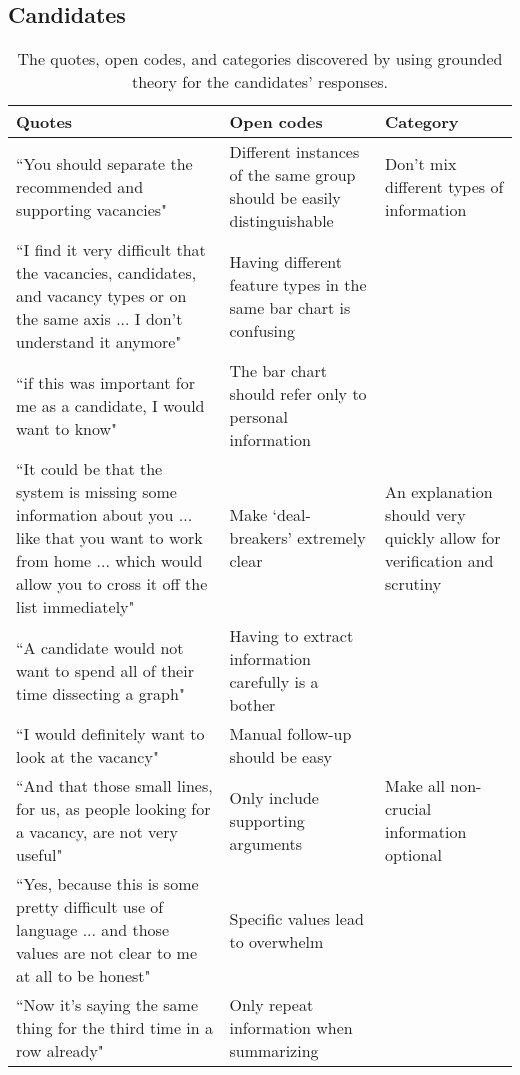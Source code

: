 \subsection{Candidates}
\begin{table*}[]
\captionsetup{width=1.5\textwidth}
\caption{The quotes, open codes, and categories discovered by using grounded theory for the candidates' responses.}
\footnotesize
\begin{adjustwidth}{-2.5in}{-2.5in}
\centering
\begin{tabularx}{1.5\textwidth}{@{}X>{\raggedright\arraybackslash}p{6.5cm}>{\raggedright\arraybackslash}p{3.5cm}@{}}
\toprule
\textbf{Quotes} &
  \textbf{Open codes} &
  \textbf{Category} \\ \midrule
``You should separate the recommended and supporting vacancies" &
  Different instances of the same group should be easily distinguishable &
  Don't mix different types of information \\ \cmidrule(r){1-1}
``I find it very difficult that the vacancies, candidates, and vacancy types or on the same axis ... I don't understand it anymore" &
  Having different feature types in the same bar chart is confusing &
   \\ \cmidrule(r){1-1}
``if this was important for me as a candidate, I would want to know" &
  The bar chart should refer only to personal information &
   \\ \midrule
``It could be that the system is missing some information about you ... like that you want to work from home ... which would allow you to cross it off the list immediately" &
  Make `deal-breakers' extremely clear &
  An explanation should very quickly allow for verification and scrutiny \\ \cmidrule(r){1-1}
``A candidate would not want to spend all of their time dissecting a graph" &
  Having to extract information carefully is a bother &
   \\ \cmidrule(r){1-1}
``I would definitely want to look at the vacancy" &
  Manual follow-up should be easy &
   \\ \midrule
``And that those small lines, for us, as people looking for a vacancy, are not very useful" &
  Only include supporting arguments &
  Make all non-crucial information optional \\ \cmidrule(r){1-1}
``Yes, because this is some pretty difficult use of language ... and those values are not clear to me at all to be honest" &
  Specific values lead to overwhelm &
   \\ \cmidrule(r){1-1}
``Now it's saying the same thing for the third time in a row already" &
  Only repeat information when summarizing &
   \\ \bottomrule

\end{tabularx}
\end{adjustwidth}
\label{tab:candidates_GT}
\end{table*}

